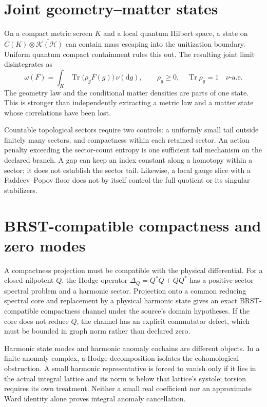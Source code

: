\documentclass[11pt,a4paper,oneside]{book}
\theoremstyle{plain}
\theoremstyle{definition}
\theoremstyle{remark}
\newcommand{\HH}{\mathcal H}
\newcommand{\dd}{\mathrm d}
\newcommand{\Tr}{\operatorname{Tr}}
\newcommand{\src}[2]{\cite{#1}}
\begin{document}
\section{Joint geometry--matter states}
On a compact metric screen $K$ and a local quantum Hilbert space, a state on $C(K)\otimes\widetilde{\mathcal K(\HH)}$ can contain mass escaping into the unitization boundary. Uniform quantum compact containment rules this out. The resulting joint limit disintegrates as
\begin{equation}
 \omega(F)=\int_K\Tr\bigl(\rho_gF(g)\bigr)\,\nu(\dd g),
 \qquad \rho_g\ge0,\quad\Tr\rho_g=1\quad\nu\text{-a.e.}
 \label{eq:joint-state}
\end{equation}
The geometry law and the conditional matter densities are parts of one state. This is stronger than independently extracting a metric law and a matter state whose correlations have been lost. \src{R12}{thm:v12v81-state-space,thm:v12v82-disintegration}

Countable topological sectors require two controls: a uniformly small tail outside finitely many sectors, and compactness within each retained sector. An action penalty exceeding the sector-count entropy is one sufficient tail mechanism on the declared branch. A gap can keep an index constant along a homotopy within a sector; it does not establish the sector tail. Likewise, a local gauge slice with a Faddeev--Popov floor does not by itself control the full quotient or its singular stabilizers. \cite{R11,R12}

\section{BRST-compatible compactness and zero modes}
A compactness projection must be compatible with the physical differential. For a closed nilpotent $Q$, the Hodge operator $\Delta_Q=Q^*Q+QQ^*$ has a positive-sector spectral problem and a harmonic sector. Projection onto a common reducing spectral core and replacement by a physical harmonic state gives an exact BRST-compatible compactness channel under the source's domain hypotheses. If the core does not reduce $Q$, the channel has an explicit commutator defect, which must be bounded in graph norm rather than declared zero. \src{R12}{prop:v12v96-channel,thm:v12v97-exact,thm:v12v98-integrated}

Harmonic state modes and harmonic anomaly cochains are different objects. In a finite anomaly complex, a Hodge decomposition isolates the cohomological obstruction. A small harmonic representative is forced to vanish only if it lies in the actual integral lattice and its norm is below that lattice's systole; torsion requires its own treatment. Neither a small real coefficient nor an approximate Ward identity alone proves integral anomaly cancellation. \src{R12}{thm:v12v19-Hodge}
\end{document}
